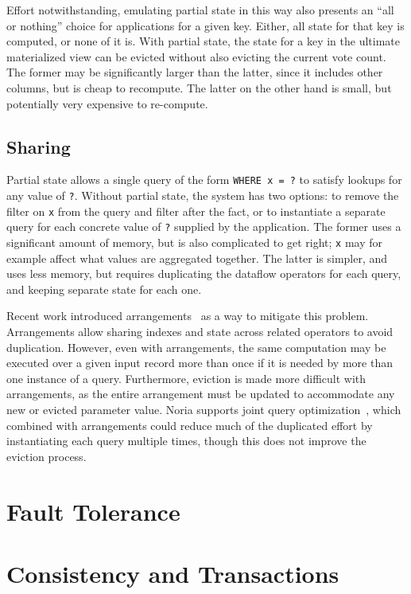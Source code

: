 Effort notwithstanding, emulating partial state in this way also presents an
``all or nothing'' choice for applications for a given key. Either, all state
for that key is computed, or none of it is. With partial state, the state for a
key in the ultimate materialized view can be evicted without also evicting the
current vote count. The former may be significantly larger than the latter,
since it includes other columns, but is cheap to recompute. The latter on the
other hand is small, but potentially very expensive to re-compute.

\subsection{Sharing}

Partial state allows a single query of the form \texttt{WHERE x = ?} to satisfy
lookups for any value of \texttt{?}. Without partial state, the system has two
options: to remove the filter on \texttt{x} from the query and filter after the
fact, or to instantiate a separate query for each concrete value of \texttt{?}
supplied by the application. The former uses a significant amount of memory, but
is also complicated to get right; \texttt{x} may for example affect what values
are aggregated together. The latter is simpler, and uses less memory, but
requires duplicating the dataflow operators for each query, and keeping separate
state for each one.

Recent work introduced arrangements~\cite{arrangements} as a way to mitigate
this problem. Arrangements allow sharing indexes and state across related
operators to avoid duplication. However, even with arrangements, the same
computation may be executed over a given input record more than once if it is
needed by more than one instance of a query. Furthermore, eviction is made more
difficult with arrangements, as the entire arrangement must be updated to
accommodate any new or evicted parameter value. Noria supports joint query
optimization~\cite{noria}, which combined with arrangements could reduce much of
the duplicated effort by instantiating each query multiple times, though this
does not improve the eviction process.

\section{Fault Tolerance}

\section{Consistency and Transactions}

